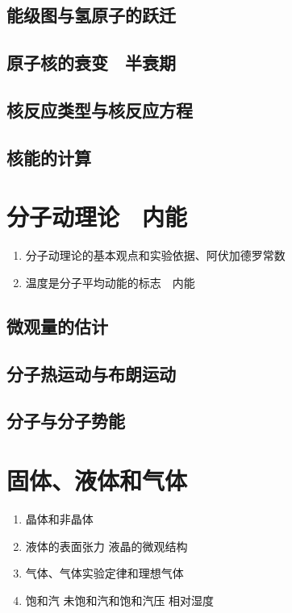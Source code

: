 \documentclass[cn,11pt,mac, simple]{elegantbook}
\begin{document}
\clearpage\section{能级图与氢原子的跃迁}

\clearpage\section{原子核的衰变　半衰期}

\clearpage\section{核反应类型与核反应方程}

\clearpage\section{核能的计算}

\chapter{分子动理论　内能}
\begin{enumerate}
   \item 分子动理论的基本观点和实验依据、阿伏加德罗常数
   \item 温度是分子平均动能的标志　内能
\end{enumerate}

\clearpage\section{微观量的估计}

\clearpage\section{分子热运动与布朗运动}

\clearpage\section{分子与分子势能}

\chapter{固体、液体和气体}
\begin{enumerate}
   \item 晶体和非晶体
   \item 液体的表面张力  液晶的微观结构
   \item 气体、气体实验定律和理想气体
   \item 饱和汽  未饱和汽和饱和汽压  相对湿度
\end{enumerate}
\end{document}
